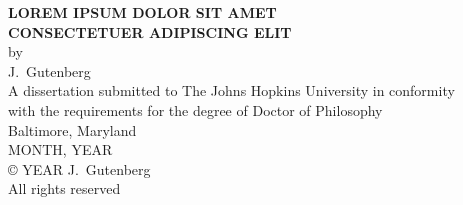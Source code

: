 \thispagestyle{empty}
\baselineskip=18pt
\begin{center}
\vspace*{3\baselineskip}
%
{\bfseries LOREM IPSUM DOLOR SIT AMET\\CONSECTETUER ADIPISCING ELIT}\\[6\baselineskip]
%
by\\
%
J.~Gutenberg\\[3\baselineskip]
%
%
A dissertation submitted to The Johns Hopkins University in conformity\\
with the requirements for the degree of Doctor of Philosophy\\[4\baselineskip]
%
Baltimore, Maryland\\
MONTH, YEAR\\[6\baselineskip]
%
{\copyright{} YEAR J.~Gutenberg\\
All rights reserved}
%
\end{center}
%
\baselineskip=24pt
\newpage 
